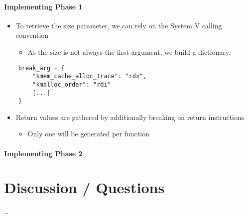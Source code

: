 \documentclass{i20lecture}
\begin{document}
\begin{frame}[fragile]{\insertsection}
  \framesubtitle{Implementing Phase 1}
    
    \begin{itemize}
     \item To retrieve the size parameter, we can rely on the System V calling convention
\pause
     \begin{itemize}
      \item As the size is not always the first argument, we build a dictionary:
     \end{itemize}
    \end{itemize}
    \begin{lstlisting}
    break_arg = {
        "kmem_cache_alloc_trace": "rdx",
        "kmalloc_order": "rdi"
        [...]
    }
    \end{lstlisting}
\pause
    \begin{itemize}
     \item Return values are gathered by additionally breaking on return instructions
     \begin{itemize}
\pause
     \item Only one will be generated per function
     \end{itemize}
    \end{itemize}
\end{frame}

\begin{frame}{\insertsection}
  \framesubtitle{Implementing Phase 2}

\end{frame}


\section{Discussion / Questions}
\begin{frame}{\insertsection}
  \begin{center}
    \LARGE \dots
  \end{center}
\end{frame}
\end{document}
